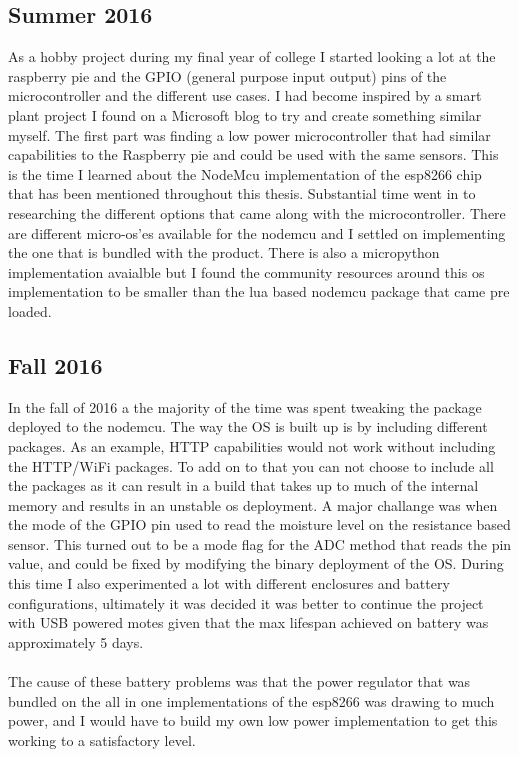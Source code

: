 \documentclass[]{uiophd}
\begin{document}
\subsection{Summer 2016}
As a hobby project during my final year of college I started looking a lot at the raspberry pie and the GPIO (general purpose input output) pins of the microcontroller and the different use cases. I had become inspired by a smart plant project I found on a Microsoft blog to try and create something similar myself. The first part was finding a low power microcontroller that had similar capabilities to the Raspberry pie and could be used with the same sensors. This is the time I learned about the NodeMcu implementation of the esp8266 chip that has been mentioned throughout this thesis. Substantial time went in to researching the different options that came along with the microcontroller. There are different micro-os'es available for the nodemcu and I settled on implementing the one that is bundled with the product. There is also a micropython implementation avaialble but I found the community resources around this os implementation to be smaller than the lua based nodemcu package that came pre loaded.
\subsection{Fall 2016}
In the fall of 2016 a the majority of the time was spent tweaking the package deployed to the nodemcu. The way the OS is built up is by including different packages. As an example, HTTP capabilities would not work without including the HTTP/WiFi packages. To add on to that you can not choose to include all the packages as it can result in a build that takes up to much of the internal memory and results in an unstable os deployment. A major challange was when the mode of the GPIO pin used to read the moisture level on the resistance based sensor. This turned out to be a mode flag for the ADC method that reads the pin value, and could be fixed by modifying the binary deployment of the OS. During this time I also experimented a lot with different enclosures and battery configurations, ultimately it was decided it was better to continue the project with USB powered motes given that the max lifespan achieved on battery was approximately 5 days.
\\\\
The cause of these battery problems was that the power regulator that was bundled on the all in one implementations of the esp8266 was drawing to much power, and I would have to build my own low power implementation to get this working to a satisfactory level.
\end{document}
